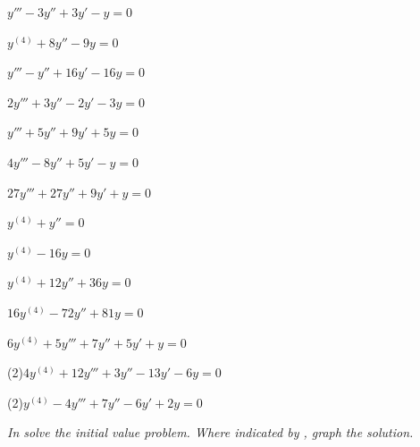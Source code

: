 \begin{exerciselistTwoColumn}

\item\label{exer:9.2.1}$y'''-3y''+3y'-y=0$
\item\label{exer:9.2.2}$y^{(4)}+8y''-9y=0$
\item\label{exer:9.2.3}$y'''-y''+16y'-16y=0$
\item\label{exer:9.2.4}$2y'''+3y''-2y'-3y=0$
\item\label{exer:9.2.5}$y'''+5y''+9y'+5y=0$%
\item\label{exer:9.2.6}$4y'''-8y''+5y'-y=0$
\item\label{exer:9.2.7}$27y'''+27y''+9y'+y=0$%
\item\label{exer:9.2.8}$y^{(4)}+y''=0$
\item\label{exer:9.2.9}$y^{(4)}-16y=0$%
\item\label{exer:9.2.10}$y^{(4)}+12y''+36y=0$
\item\label{exer:9.2.11}$16y^{(4)}-72y''+81y=0$%
\item\label{exer:9.2.12}$6y^{(4)}+5y'''+7y''+5y'+y=0$
\item(2)\label{exer:9.2.13}$4y^{(4)}+12y'''+3y''-13y'-6y=0$
\item(2)\label{exer:9.2.14}$y^{(4)}-4y'''+7y''-6y'+2y=0$
\end{exerciselistTwoColumn}
%
\textsl{In  solve the
initial value problem. Where indicated by \CGex, graph the solution.}
